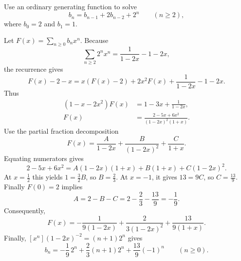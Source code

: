 \documentclass[11pt, oneside]{article}
\begin{document}
\begin{problem}
Use an ordinary generating function to solve
\[
b_n=b_{n-1}+2b_{n-2}+2^n\qquad(n\ge2),
\]
where $b_0=2$ and $b_1=1$.
\end{problem}
\begin{solution}
Let $F(x)=\displaystyle\sum_{n\ge0}b_nx^n$.
Because
\[
\sum_{n\ge2}2^nx^n=\frac1{1-2x}-1-2x,
\]
the recurrence gives
\[
F(x)-2-x=x(F(x)-2)+2x^2F(x)
+\frac1{1-2x}-1-2x.
\]
Thus
\[
\begin{aligned}
(1-x-2x^2)F(x)&=1-3x+\frac1{1-2x}, \\
F(x)&=\frac{2-5x+6x^2}{(1-2x)^2(1+x)}.
\end{aligned}
\]
Use the partial fraction decomposition
\[
F(x)=\frac{A}{1-2x}+\frac{B}{(1-2x)^2}
+\frac{C}{1+x}.
\]
Equating numerators gives
\[
2-5x+6x^2=A(1-2x)(1+x)+B(1+x)+C(1-2x)^2.
\]
At $x=\frac12$ this yields $1=\frac32 B$, so $B=\frac23$.
At $x=-1$, it gives $13=9C$, so $C=\frac{13}{9}$.
Finally $F(0)=2$ implies
\[
A=2-B-C=2-\frac23-\frac{13}{9}=-\frac19.
\]
Consequently,
\[
F(x)=-\frac1{9(1-2x)}+\frac2{3(1-2x)^2}
+\frac{13}{9(1+x)}.
\]
Finally, $[x^n](1-2x)^{-2}=(n+1)2^n$ gives
\[
\boxed{b_n=-\frac19\,2^n+\frac23(n+1)2^n
+\frac{13}{9}(-1)^n\qquad(n\ge0).}
\]
\end{solution}
\end{document}
